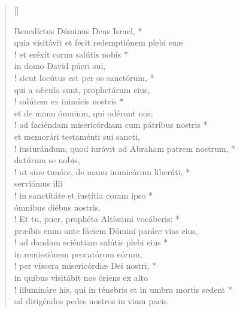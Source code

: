 \def\greinitialformat#1{{\fontsize{40}{40}\selectfont #1}}
\gresetfirstlineaboveinitial{\small \textcolor{red}{sabbato}}{}
\setaboveinitialseparation{0.72mm}


\vspace{0.3cm}
\begin{verse}[\versewidth]
	


Benedíctus Dóminus Deus Israel, *\\
quia visitávit et fecit redemptiónem plebi suæ\\!
\vin et eréxit cornu salútis nobis *\\
\vin in domo David púeri sui,\\!
sicut locútus est per os sanctórum, *\\
qui a sǽculo sunt, prophetárum eius,\\!
\vin salútem ex inimícis nostris *\\
\vin et de manu ómnium, qui odérunt nos;\\!
ad faciéndam misericórdiam cum pátribus nostris *\\
et memorári testaménti sui sancti,\\!
\vin iusiurándum, quod iurávit ad Abraham patrem nostrum, *\\
\vin datúrum se nobis,\\!
ut sine timóre, de manu inimicórum liberáti, *\\
serviámus illi\\!
\vin in sanctitáte et iustítia coram ipso *\\
\vin ómnibus diébus nostris.\\!
Et tu, puer, prophéta Altíssimi vocáberis: *\\
præíbis enim ante fáciem Dómini paráre vias eius,\\!
\vin ad dandam sciéntiam salútis plebi eius *\\
\vin in remissiónem peccatórum eórum,\\!
per víscera misericórdiæ Dei nostri, *\\
in quibus visitábit nos óriens ex alto\\!
\vin illumináre his, qui in ténebris et in umbra mortis sedent *\\
\vin ad dirigéndos pedes nostros in viam pacis.\\
\end{verse}
\vspace{1cm}


